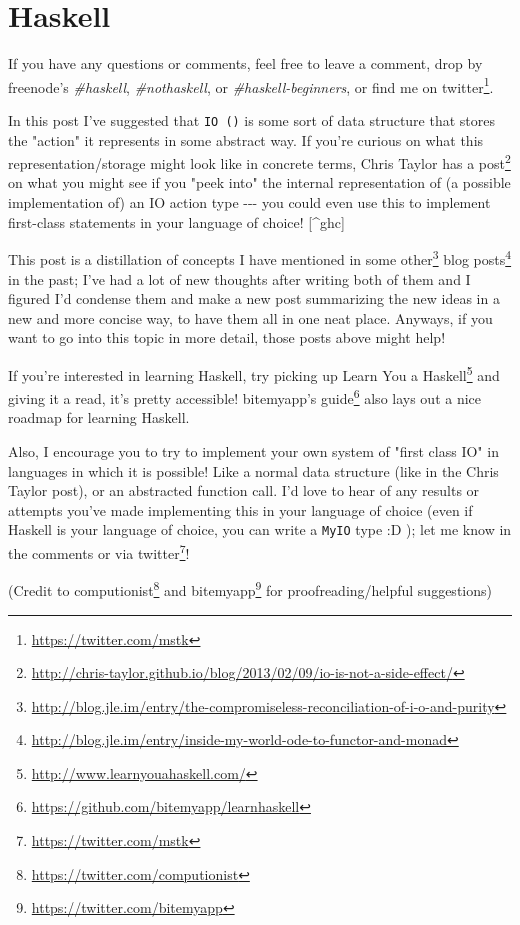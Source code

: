 \documentclass[]{article}
\renewcommand{\href}[2]{#2\footnote{\url{#1}}}
\begin{document}
\section{Haskell}

If you have any questions or comments, feel free to leave a comment, drop by
freenode's \emph{\#haskell}, \emph{\#nothaskell}, or \emph{\#haskell-beginners},
or find me on \href{https://twitter.com/mstk}{twitter}.

In this post I've suggested that \texttt{IO\ ()} is some sort of data structure
that stores the "action" it represents in some abstract way. If you're curious
on what this representation/storage might look like in concrete terms,
\href{http://chris-taylor.github.io/blog/2013/02/09/io-is-not-a-side-effect/}{Chris
Taylor has a post} on what you might see if you "peek into" the internal
representation of (a possible implementation of) an IO action type -\/-\/- you
could even use this to implement first-class statements in your language of
choice! {[}\^{}ghc{]}

This post is a distillation of concepts I have mentioned in
\href{http://blog.jle.im/entry/the-compromiseless-reconciliation-of-i-o-and-purity}{some
other}
\href{http://blog.jle.im/entry/inside-my-world-ode-to-functor-and-monad}{blog
posts} in the past; I've had a lot of new thoughts after writing both of them
and I figured I'd condense them and make a new post summarizing the new ideas in
a new and more concise way, to have them all in one neat place. Anyways, if you
want to go into this topic in more detail, those posts above might help!

If you're interested in learning Haskell, try picking up
\href{http://www.learnyouahaskell.com/}{Learn You a Haskell} and giving it a
read, it's pretty accessible!
\href{https://github.com/bitemyapp/learnhaskell}{bitemyapp's guide} also lays
out a nice roadmap for learning Haskell.

Also, I encourage you to try to implement your own system of "first class IO" in
languages in which it is possible! Like a normal data structure (like in the
Chris Taylor post), or an abstracted function call. I'd love to hear of any
results or attempts you've made implementing this in your language of choice
(even if Haskell is your language of choice, you can write a \texttt{MyIO} type
:D ); let me know in the comments or via
\href{https://twitter.com/mstk}{twitter}!

(Credit to \href{https://twitter.com/computionist}{computionist} and
\href{https://twitter.com/bitemyapp}{bitemyapp} for proofreading/helpful
suggestions)
\end{document}
